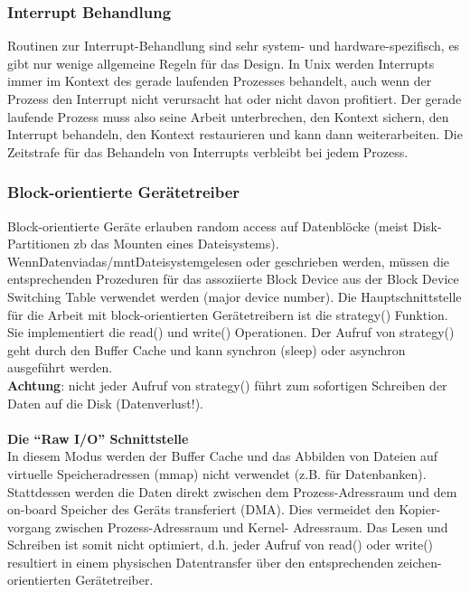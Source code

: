 \documentclass[a4paper, 10pt]{article}
\newcommand{\Bold}[1]{\textbf{#1}} %
\begin{document}
\subsubsection{Interrupt Behandlung}
Routinen zur Interrupt-Behandlung sind sehr system- und hardware-spezifisch, es gibt nur wenige allgemeine Regeln für das Design. In Unix werden Interrupts immer im Kontext des gerade laufenden Prozesses behandelt, auch wenn der Prozess den Interrupt nicht verursacht hat oder nicht davon profitiert. Der gerade laufende Prozess muss also seine Arbeit unterbrechen, den Kontext sichern, den Interrupt behandeln, den Kontext restaurieren und kann dann weiterarbeiten. Die Zeitstrafe für das Behandeln von Interrupts verbleibt bei jedem Prozess.

\subsubsection{Block-orientierte Gerätetreiber}
Block-orientierte Geräte erlauben random access auf Datenblöcke (meist Disk-Partitionen zb das Mounten eines Dateisystems).	WennDatenviadas/mntDateisystemgelesen oder geschrieben werden, müssen die entsprechenden Prozeduren für das assoziierte Block Device aus der Block Device Switching Table verwendet werden (major device number). Die Hauptschnittstelle für die Arbeit mit block-orientierten Gerätetreibern ist die strategy() Funktion. Sie implementiert die read() und write() Operationen. Der Aufruf von strategy() geht durch den Buffer Cache und kann synchron (sleep) oder asynchron ausgeführt werden. \\
\Bold {Achtung}: nicht jeder Aufruf von strategy() führt zum sofortigen Schreiben der Daten auf die Disk (Datenverlust!). \\ \\
\Bold {Die “Raw I/O” Schnittstelle}\\
In diesem Modus werden der Buffer Cache und das Abbilden von Dateien auf virtuelle Speicheradressen (mmap) nicht verwendet (z.B. für Datenbanken). Stattdessen werden die Daten direkt zwischen dem Prozess-Adressraum und dem on-board Speicher des Geräts transferiert (DMA). Dies vermeidet den Kopier- vorgang zwischen Prozess-Adressraum und Kernel- Adressraum. Das Lesen und Schreiben ist somit nicht optimiert, d.h. jeder Aufruf von read() oder write() resultiert in
einem physischen Datentransfer über den entsprechenden zeichen-orientierten Gerätetreiber.
\end{document}
